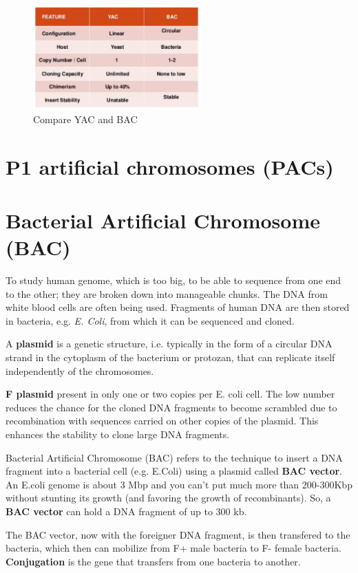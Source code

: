 \begin{figure}[htb]
  \centerline{\includegraphics[height=4cm]{./images/YAC-BAC.eps}}
  \caption{Compare YAC and BAC}\label{fig:YAC-BAC}
\end{figure}


\section{P1 artificial chromosomes (PACs)}
\label{sec:PAC}

\section{Bacterial Artificial Chromosome (BAC)}
\label{sec:BAC}
\label{sec:plasmid-vector}

To study human genome, which is too big, to be able to sequence from one end to
the other; they are broken down into manageable chunks. The DNA from white blood
cells are often being used. Fragments of human DNA are then stored in bacteria,
e.g. {\it E. Coli}, from which it can be sequenced and cloned.

A {\bf plasmid} is a genetic structure, i.e. typically in the form of a circular DNA
strand in the cytoplasm of the bacterium or protozan, that can replicate itself
independently of the chromosomes. 

{\bf F plasmid} present in only one or two copies per E. coli cell.
The low number reduces the chance for  the cloned DNA fragments to become
scrambled due to recombination with sequences carried on other copies of the
plasmid. This enhances the stability to clone large DNA fragments.

Bacterial Artificial Chromosome (BAC) refers to the technique to insert a DNA
fragment into a bacterial cell (e.g. E.Coli) using a plasmid called {\bf BAC
vector}. An E.coli genome is about 3 Mbp and you can't put much more than
200-300Kbp without stunting its growth (and favoring the growth of
recombinants). So, a {\bf BAC vector} can hold a DNA fragment of up to 300 kb.

The BAC vector, now with the foreigner DNA fragment, is then transfered to the
bacteria, which then can mobilize from F+ male bacteria to F- female bacteria.
{\bf Conjugation} is the gene that transfers from one bacteria to another.

